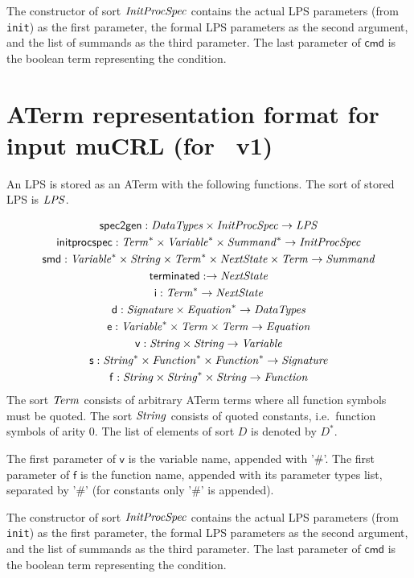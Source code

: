 \documentclass[fleqn,a4paper]{article}
\newcommand{\aterm}[1]{\mathsf{#1}}
\newcommand{\afunc}[3]{\aterm{#1}:#2\rightarrow#3}
\begin{document}
The constructor of sort $\mathit{InitProcSpec}$ contains the actual LPS
parameters (from \texttt{init}) as the first parameter, the formal LPS
parameters as the second argument, and the list of summands as the
third parameter. The last parameter of $\mathsf{cmd}$ is the boolean term
representing the condition.

\newpage
\section{ATerm representation format for input muCRL (for \mcrl\ v1)}
An LPS is stored as an ATerm with the following functions. The sort
of stored LPS is $\mathit{LPS}$.

\begin{gather*}
\afunc{spec2gen}{\nm{DataTypes}\x\nm{InitProcSpec}}{\nm{LPS}}\\
\afunc{initprocspec}{\nm{Term}^*\x\nm{Variable}^*\x\nm{Summand}^*}{\nm{InitProcSpec}}\\
\afunc{smd}{\nm{Variable}^*\x\nm{String}\x\nm{Term}^*\x\nm{NextState}\x\nm{Term}}{\nm{Summand}}\\
\afunc{terminated}{}{\nm{NextState}}\\
\afunc{i}{\nm{Term}^*}{\nm{NextState}}\\
\afunc{d}{\nm{Signature}\x\nm{Equation}^*}{\nm{DataTypes}}\\
\afunc{e}{\nm{Variable}^*\x\nm{Term}\x\nm{Term}}{\nm{Equation}}\\
\afunc{v}{\nm{String}\x\nm{String}}{\nm{Variable}}\\
\afunc{s}{\nm{String}^*\x\nm{Function}^*\x\nm{Function}^*}{\nm{Signature}}\\
\afunc{f}{\nm{String}\x\nm{String}^{*}\x\nm{String}}{\nm{Function}}
\end{gather*}
The sort $\mathit{Term}$ consists of arbitrary ATerm terms where all function
symbols must be quoted. The sort $\mathit{String}$ consists of quoted constants,
i.e.\ function symbols of arity 0. The list
of elements of sort $D$ is denoted by $D^{*}$.

The first parameter of $\mathsf{v}$ is the variable name, appended with '\#'.
The first parameter of $\mathsf{f}$ is the function name, appended
with its parameter types list, separated by '\#' (for constants only '\#' is appended).

The constructor of sort $\mathit{InitProcSpec}$ contains the actual LPS
parameters (from \texttt{init}) as the first parameter, the formal LPS
parameters as the second argument, and the list of summands as the
third parameter. The last parameter of $\mathsf{cmd}$ is the boolean term
representing the condition.

%
%
\end{document}
